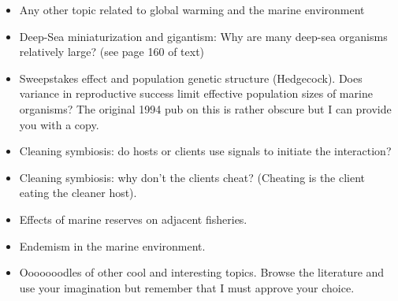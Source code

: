 \documentclass[11pt]{article}
\begin{document}
\begin{itemize}
	\item Any other topic related to global warming and the marine environment

	\item Deep-Sea miniaturization and gigantism: Why are many deep-sea organisms relatively large?  (see page 160 of text)

	\item Sweepstakes effect and population genetic structure (Hedgecock). Does variance in reproductive success limit effective population sizes of marine organisms?  The original 1994 pub on this is rather obscure but I can provide you with a copy.

	\item Cleaning symbiosis:  do hosts or clients use signals to initiate the interaction?

	\item Cleaning symbiosis: why don’t the clients cheat?  (Cheating is the client eating the cleaner host).

	\item Effects of marine reserves on adjacent fisheries.

	\item Endemism in the marine environment.

	\item Ooooooodles of other cool and interesting topics.  Browse the literature and use your imagination but remember that I must approve your choice.

\end{itemize}
\end{document}
